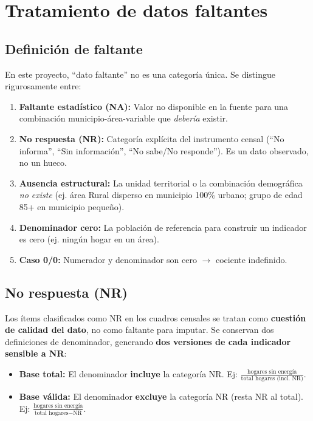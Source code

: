 \section{Tratamiento de datos faltantes}
\label{ch:tratamiento_faltantes}

\subsection{Definición de faltante}
\label{sec:def_faltante}

En este proyecto, ``dato faltante'' no es una categoría única. Se distingue rigurosamente entre:

\begin{enumerate}
    \item \textbf{Faltante estadístico (NA):} Valor no disponible en la fuente para una combinación municipio-área-variable que \textit{debería} existir.
    \item \textbf{No respuesta (NR):} Categoría explícita del instrumento censal (``No informa'', ``Sin información'', ``No sabe/No responde''). Es un dato observado, no un hueco.
    \item \textbf{Ausencia estructural:} La unidad territorial o la combinación demográfica \textit{no existe} (ej. área Rural disperso en municipio 100\% urbano; grupo de edad 85+ en municipio pequeño).
    \item \textbf{Denominador cero:} La población de referencia para construir un indicador es cero (ej. ningún hogar en un área).
    \item \textbf{Caso 0/0:} Numerador y denominador son cero $\rightarrow$ cociente indefinido.
\end{enumerate}

\subsection{No respuesta (NR)}
\label{sec:no_respuesta}

Los ítems clasificados como NR en los cuadros censales se tratan como \textbf{cuestión de calidad del dato}, no como faltante para imputar. Se conservan dos definiciones de denominador, generando \textbf{dos versiones de cada indicador sensible a NR}:

\begin{itemize}
    \item \textbf{Base total:} El denominador \textbf{incluye} la categoría NR. Ej: $\frac{\text{hogares sin energía}}{\text{total hogares (incl. NR)}}$.
    \item \textbf{Base válida:} El denominador \textbf{excluye} la categoría NR (resta NR al total). Ej: $\frac{\text{hogares sin energía}}{\text{total hogares} - \text{NR}}$.
\end{itemize}

